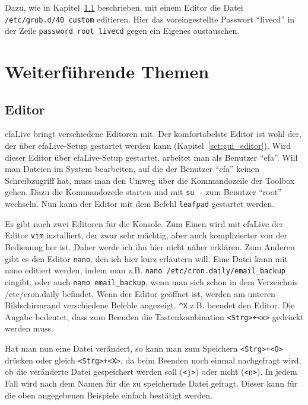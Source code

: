 \documentclass[a4paper,12pt,twoside]{article}
\begin{document}
Dazu, wie in Kapitel~\ref{sct:editor} beschrieben, mit
einem Editor die Datei \linebreak[4]\texttt{/etc/grub.d/40\_custom} editieren. Hier das
voreingestellte Passwort "`livecd"' in der
Zeile \texttt{password root livecd} gegen ein
Eigenes austauschen.


\section{Weiterführende Themen}
\label{sct:weitere_themen}
\subsection{Editor}
\label{sct:editor}
efaLive bringt verschiedene Editoren
mit. Der komfortabelste Editor ist wohl der, der über efaLive-Setup
gestartet werden kann (Kapitel~\ref{sct:gui_editor}).
Wird dieser Editor über efaLive-Setup gestartet, arbeitet man als
Benutzer "`efa"'. Will man Dateien im System
bearbeiten, auf die der Benutzer "`efa"'
keinen Schreibzugriff hat, muss man den Umweg über die Kommandozeile
der Toolbox gehen. Dazu die Kommandozeile starten und mit
\texttt{su -} zum Benutzer
"`root"' wechseln. Nun kann der Editor mit
dem Befehl \texttt{leafpad} gestartet werden.

Es gibt noch zwei Editoren für die Konsole. Zum Einen wird mit efaLive
der Editor \texttt{vim} installiert, der zwar sehr
mächtig, aber auch komplizierter von der Bedienung her ist. Daher werde
ich ihn hier nicht näher erklären. Zum Anderen gibt es den Editor
\texttt{nano}, den ich hier kurz erläutern will.
Eine Datei kann mit nano editiert werden, indem man z.B.
\texttt{nano /etc/cron.daily/email\_backup}
eingibt, oder auch \texttt{nano email\_backup},
wenn man sich schon in dem Verzeichnis /etc/cron.daily befindet. Wenn
der Editor geöffnet ist, werden am unteren Bildschirmrand verschiedene
Befehle angezeigt. \texttt{\^{}X} z.B. beendet den
Editor. Die Angabe bedeutet, dass zum Beenden die Tastenkombination
\texttt{{\textless}Strg{\textgreater}+{\textless}x{\textgreater}} gedrückt
werden muss.

Hat man nun eine Datei verändert, so kann man zum Speichern
\texttt{{\textless}Strg{\textgreater}+{\textless}O{\textgreater}} drücken oder
gleich \texttt{{\textless}Strg{\textgreater}+{\textless}X{\textgreater}}, da
beim Beenden noch einmal nachgefragt wird, ob die veränderte Datei
gespeichert werden soll (\texttt{{\textless}j{\textgreater}}) oder nicht
(\texttt{{\textless}n{\textgreater}}). In jedem Fall wird nach dem Namen für die
zu speichernde Datei gefragt. Dieser kann für die oben angegebenen
Beispiele einfach bestätigt werden.
\end{document}
